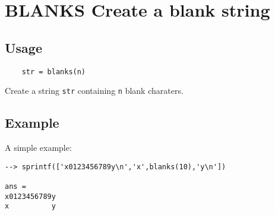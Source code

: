 \section{BLANKS Create a blank string}

\subsection{Usage}

\begin{verbatim}
    str = blanks(n)
\end{verbatim}
Create a string \verb|str| containing \verb|n| blank charaters.
\subsection{Example}

A simple example:
\begin{verbatim}
--> sprintf(['x0123456789y\n','x',blanks(10),'y\n'])

ans = 
x0123456789y
x          y
\end{verbatim}
